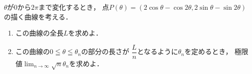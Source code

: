 \documentclass[../../main.tex]{subfiles}
\begin{document}
$\theta$が0から$2\pi$まで変化するとき，
点$P(\theta)=(2\cos\theta-\cos2\theta,2\sin\theta-\sin2\theta)$の描く曲線を考える．
\begin{enumerate}
  \item この曲線の全長$L$を求めよ．
  \item この曲線の$0\leqq\theta\leqq\theta_n$の部分の長さが
    $\displaystyle\dfrac{L}{n}$となるように$\theta_n$を定めるとき，
    極限値$\displaystyle\lim_{n\to\infty}\sqrt{n}\theta_n$を求めよ．
\end{enumerate}
\end{document}
